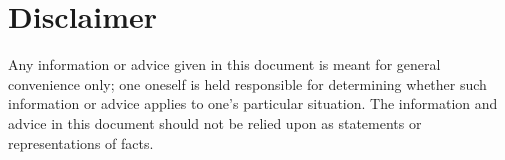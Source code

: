 \vfill\tiny
\section*{\tiny Disclaimer}
Any information or advice given in this document is meant for general
convenience only; one oneself is held responsible for determining
whether such information or advice applies to one's particular
situation. The information and advice in this document should not be
relied upon as statements or representations of facts.



